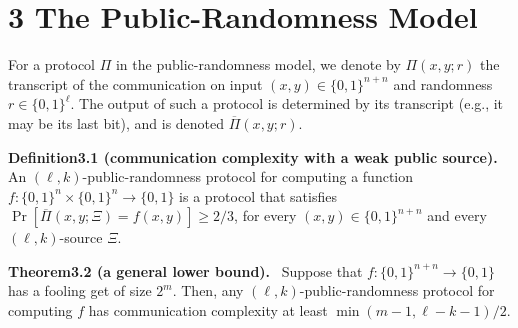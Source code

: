 \documentclass[10pt,a4paper]{article}
\newenvironment{authorclaim}[1]{\par\medskip\noindent\textbf{#1.}\ }{\par\medskip}
\begin{document}
\section*{3 The Public-Randomness Model}
For a protocol $\Pi$ in the public-randomness model, we denote by $\Pi(x,y;r)$ the transcript of the communication on input $(x,y)\in\{0,1\}^{n+n}$ and randomness $r\in\{0,1\}^\ell$. The output of such a protocol is determined by its transcript (e.g., it may be its last bit), and is denoted $\overline\Pi(x,y;r)$.
\begin{authorclaim}{Definition3.1 (communication complexity with a weak public source)}
An $(\ell,k)$-public-randomness protocol for computing a function $f:\{0,1\}^n\times\{0,1\}^n\to\{0,1\}$ is a protocol that satisfies $\Pr[\overline\Pi(x,y;\Xi)=f(x,y)]\ge2/3$, for every $(x,y)\in\{0,1\}^{n+n}$ and every $(\ell,k)$-source $\Xi$.
\end{authorclaim}

\begin{authorclaim}{Theorem3.2 (a general lower bound)}
Suppose that $f:\{0,1\}^{n+n}\to\{0,1\}$ has a fooling get of size $2^m$. Then, any $(\ell,k)$-public-randomness protocol for computing $f$ has communication complexity at least $\min(m-1,\ell-k-1)/2$.
\end{authorclaim}
\end{document}
